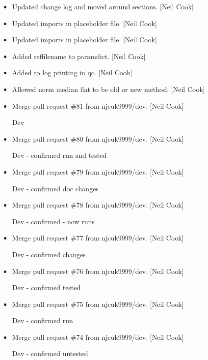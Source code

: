 \documentclass[a4paper,10pt,english]{report}
\begin{document}
\begin{itemize}
\item {} 
Updated change log and moved around sections. {[}Neil Cook{]}

\item {} 
Updated imports in placeholder file. {[}Neil Cook{]}

\item {} 
Updated imports in placeholder file. {[}Neil Cook{]}

\item {} 
Added reffilename to paramdict. {[}Neil Cook{]}

\item {} 
Added to log printing in qc. {[}Neil Cook{]}

\item {} 
Allowed norm median flat to be old or new method. {[}Neil Cook{]}

\item {} 
Merge pull request \#81 from njcuk9999/dev. {[}Neil Cook{]}

Dev

\item {} 
Merge pull request \#80 from njcuk9999/dev. {[}Neil Cook{]}

Dev - confirmed run and tested

\item {} 
Merge pull request \#79 from njcuk9999/dev. {[}Neil Cook{]}

Dev - confirmed doc changes

\item {} 
Merge pull request \#78 from njcuk9999/dev. {[}Neil Cook{]}

Dev - confirmed -  now runs

\item {} 
Merge pull request \#77 from njcuk9999/dev. {[}Neil Cook{]}

Dev - confirmed changes

\item {} 
Merge pull request \#76 from njcuk9999/dev. {[}Neil Cook{]}

Dev - confirmed tested

\item {} 
Merge pull request \#75 from njcuk9999/dev. {[}Neil Cook{]}

Dev - confirmed run

\item {} 
Merge pull request \#74 from njcuk9999/dev. {[}Neil Cook{]}

Dev - confirmed untested


\end{itemize}
\end{document}
